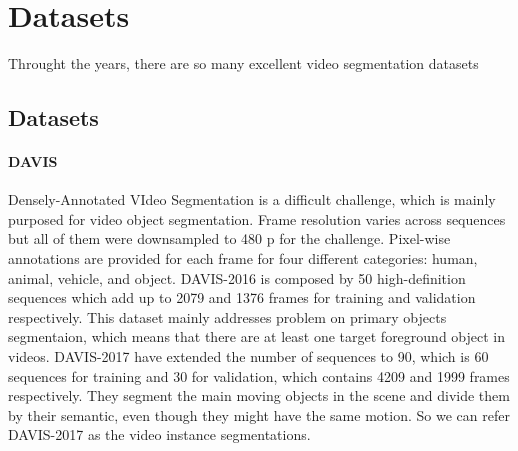 \section{Datasets}
Throught the years,  there are so many excellent video segmentation datasets
\subsection{Datasets}

\paragraph{DAVIS}

Densely-Annotated VIdeo Segmentation is a  difficult challenge, which is mainly purposed for video object segmentation.
Frame resolution varies across sequences but all of them were downsampled to 480 p for the challenge. 
Pixel-wise annotations are provided for each frame for four different categories: human, animal, vehicle, and object.
DAVIS-2016 \cite{DAVIS2016}is composed by 50 high-definition sequences which add up to 2079 and 1376 frames for training and validation respectively.
This dataset mainly addresses problem on primary objects segmentaion, which means that there are at least one target foreground object in videos.
DAVIS-2017 \cite{DAVIS2017} have extended the number of sequences to 90, which is 60 sequences for training and 30 for validation, which contains 4209 and 1999 frames respectively.
They segment the main moving objects in the scene and divide them by their semantic, even though they might have the same motion. So we can refer DAVIS-2017 as the video instance segmentations.

